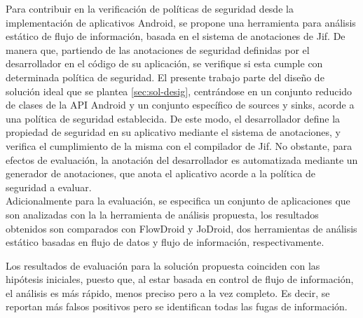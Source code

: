 Para contribuir en la verificación de políticas de seguridad desde la
implementación de aplicativos Android, se propone una herramienta para análisis
estático de flujo de información, basada en el sistema de anotaciones de Jif.
De manera que, partiendo de las anotaciones de seguridad definidas por el
desarrollador en el código de su aplicación, se verifique si esta cumple 
con determinada política de seguridad.\newline
El presente trabajo parte del diseño de solución ideal que se plantea
\ref{sec:sol-desig}, centrándose en un conjunto reducido de clases de la API
Android y un conjunto específico de sources y sinks, acorde a una política de
seguridad establecida.\newline 
De este modo, el desarrollador define la propiedad de seguridad en su
aplicativo mediante el sistema de anotaciones, y verifica el cumplimiento de la
misma con el compilador de Jif.\newline 
No obstante, para efectos de evaluación, la anotación del desarrollador es
automatizada mediante un generador de anotaciones, que anota el aplicativo
acorde a la política de seguridad a evaluar.\\
Adicionalmente para la evaluación, se especifica un conjunto de aplicaciones que
son analizadas con la la herramienta de análisis propuesta, los resultados
obtenidos son comparados con FlowDroid y JoDroid, dos herramientas de análisis
estático basadas en flujo de datos y flujo de información, respectivamente.

Los resultados de evaluación para la solución propuesta coinciden con las
hipótesis iniciales, puesto que, al estar basada en control de flujo de
información, el análisis es más rápido, menos preciso pero a la vez completo. Es
decir, se reportan más falsos positivos pero se identifican todas las fugas de
información.

























